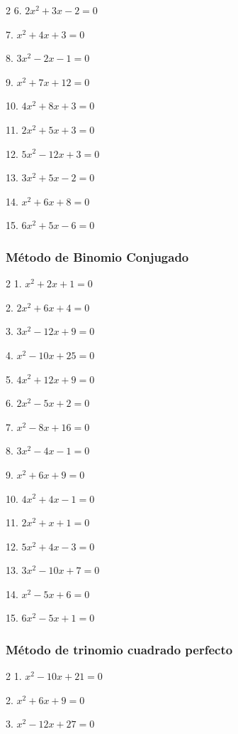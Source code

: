 \documentclass[12pt]{article}
\begin{document}
{\begin{multicols}{2}
6. $2x^2 + 3x - 2 = 0$

7. $x^2 + 4x + 3 = 0$

8. $3x^2 - 2x - 1 = 0$

9. $x^2 + 7x + 12 = 0$

10. $4x^2 + 8x + 3 = 0$

11. $2x^2 + 5x + 3 = 0$

12. $5x^2 - 12x + 3 = 0$

13. $3x^2 + 5x - 2 = 0$

14. $x^2 + 6x + 8 = 0$

15. $6x^2 + 5x - 6 = 0$
\end{multicols}

\subsubsection{Método de Binomio Conjugado}\label{muxe9todo-de-binomio-conjugado}

\begin{multicols}{2}
1. $x^2 + 2x + 1 = 0$

2. $2x^2 + 6x + 4 = 0$

3. $3x^2 - 12x + 9 = 0$

4. $x^2 - 10x + 25 = 0$

5. $4x^2 + 12x + 9 = 0$

6. $2x^2 - 5x + 2 = 0$

7. $x^2 - 8x + 16 = 0$

8. $3x^2 - 4x - 1 = 0$

9. $x^2 + 6x + 9 = 0$

10. $4x^2 + 4x - 1 = 0$

11. $2x^2 + x + 1 = 0$

12. $5x^2 + 4x - 3 = 0$

13. $3x^2 - 10x + 7 = 0$

14. $x^2 - 5x + 6 = 0$

15. $6x^2 - 5x + 1 = 0$
\end{multicols}

\subsubsection{Método de trinomio cuadrado perfecto}\label{muxe9todo-de-trinomio-cuadrado-perfecto}

\begin{multicols}{2}
1. $x^2 - 10x + 21 = 0$

2. $x^2 + 6x + 9 = 0$

3. $x^2 - 12x + 27 = 0$


\end{multicols}}
\end{document}
